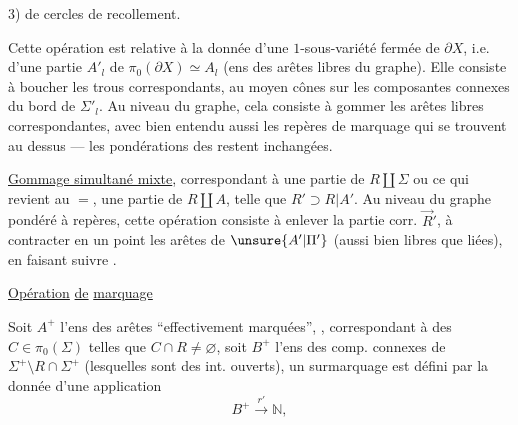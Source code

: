 
3)   de cercles de recollement.

Cette opération est relative à la donnée d'une $1$-sous-variété fermée de $\partial X$, i.e. d'une partie $A'_l$ de $\pi_0(\partial X)\simeq A_l$ (ens des arêtes libres du graphe). Elle consiste à boucher les trous correspondants, au moyen  cônes sur les composantes connexes du bord de $\Sigma'_l$. Au niveau du graphe, cela consiste à gommer les arêtes libres correspondantes, avec bien entendu aussi les repères de marquage qui se trouvent au dessus ---  les pondérations des  restent inchangées.

 \uline{Gommage simultané mixte},  correspondant à une partie    de $R\amalg\Sigma$       ou ce qui revient au $=$, une partie  de $R\amalg A$, telle que $R'\supset R|A'$. Au niveau du graphe pondéré à repères, cette opération consiste à enlever   la partie corr. $\vec R'$, à contracter en un point les arêtes de $\unsure{A'|\Pi'}$ (aussi bien libres que liées), en faisant suivre .


  \uline{Opération} \uline{de} \uline{marquage}


 Soit $A^+$ l'ens des arêtes  ``effectivement marquées'',  , correspondant à des $C\in\pi_0(\Sigma)$ telles que $C\cap R\ne\varnothing$, soit $B^+$ l'ens des comp. connexes de $\Sigma^+\setminus R\cap\Sigma^+$ (lesquelles sont des int. ouverts), un surmarquage est défini par la donnée d'une application
\[
 B^+\xrightarrow{r'}\mathbb N,
\]

